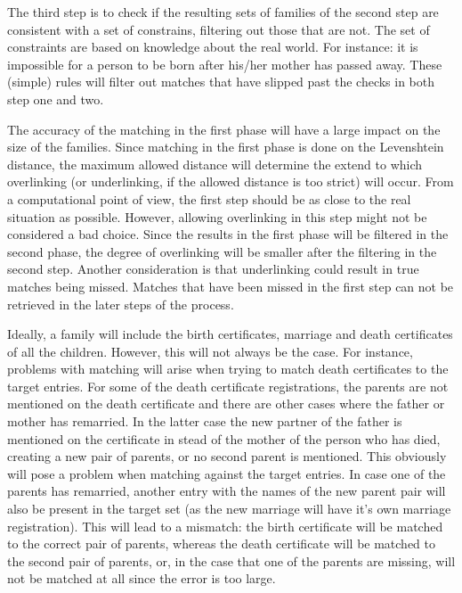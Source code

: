 The third step is to check if the resulting sets of families of the second step are consistent with a set of constrains, filtering out those that are not. The set of constraints are based on knowledge about the real world. For instance: it is impossible for a person to be born after his/her mother has passed away. These (simple) rules will filter out matches that have slipped past the checks in both step one and two. \newline

The accuracy of the matching in the first phase will have a large impact on the size of the families. Since matching in the first phase is done on the Levenshtein distance, the maximum allowed distance will determine the extend to which overlinking (or underlinking, if the allowed distance is too strict) will occur. From a computational point of view, the first step should be as close to the real situation as possible. However, allowing overlinking in this step might not be considered a bad choice. Since the results in the first phase will be filtered in the second phase, the degree of overlinking will be smaller after the filtering in the second step. Another consideration is that underlinking could result in true matches being missed. Matches that have been missed in the first step can not be retrieved in the later steps of the process. \newline

Ideally, a family will include the birth certificates, marriage and death certificates of all the children. However, this will not always be the case. For instance, problems with matching will arise when trying to match death certificates to the target entries. For some of the death certificate registrations, the parents are not mentioned on the death certificate and there are other cases where the father or mother has remarried. 
In the latter case the new partner of the father is mentioned on the certificate in stead of the mother of the person who has died, creating a new pair of parents, or no second parent is mentioned. This obviously will pose a problem when matching against the target entries. In case one of the parents has remarried, another entry with the names of the new parent pair will also be present in the target set (as the new marriage will have it's own marriage registration). This will lead to a mismatch: the birth certificate will be matched to the correct pair of parents, whereas the death certificate will be  matched to the second pair of parents, or, in the case that one of the parents are missing, will not be matched at all since the error is too large.  \newline


